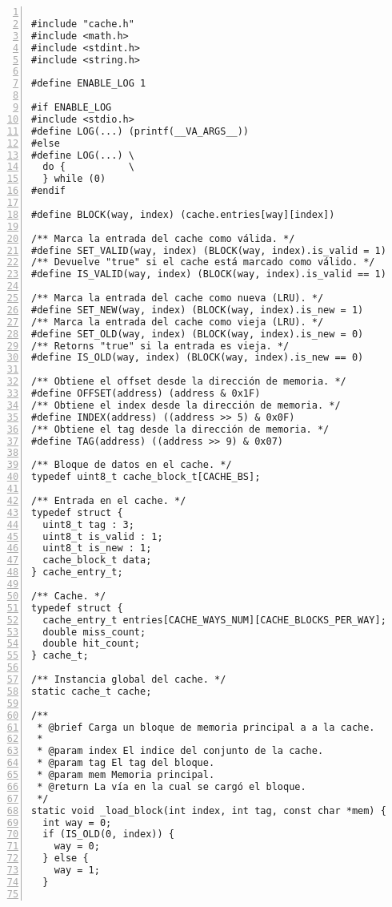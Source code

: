 \documentclass[11pt,a4paper]{article}
\begin{document}
\begin{lstlisting}[numbers=left, tabsize=2, basicstyle=\fontsize{11}{13}\ttfamily, frame=single, caption={makefile}]

#include "cache.h"
#include <math.h>
#include <stdint.h>
#include <string.h>

#define ENABLE_LOG 1

#if ENABLE_LOG
#include <stdio.h>
#define LOG(...) (printf(__VA_ARGS__))
#else
#define LOG(...) \
  do {           \
  } while (0)
#endif

#define BLOCK(way, index) (cache.entries[way][index])

/** Marca la entrada del cache como válida. */
#define SET_VALID(way, index) (BLOCK(way, index).is_valid = 1)
/** Devuelve "true" si el cache está marcado como válido. */
#define IS_VALID(way, index) (BLOCK(way, index).is_valid == 1)

/** Marca la entrada del cache como nueva (LRU). */
#define SET_NEW(way, index) (BLOCK(way, index).is_new = 1)
/** Marca la entrada del cache como vieja (LRU). */
#define SET_OLD(way, index) (BLOCK(way, index).is_new = 0)
/** Retorns "true" si la entrada es vieja. */
#define IS_OLD(way, index) (BLOCK(way, index).is_new == 0)

/** Obtiene el offset desde la dirección de memoria. */
#define OFFSET(address) (address & 0x1F)
/** Obtiene el index desde la dirección de memoria. */
#define INDEX(address) ((address >> 5) & 0x0F)
/** Obtiene el tag desde la dirección de memoria. */
#define TAG(address) ((address >> 9) & 0x07)

/** Bloque de datos en el cache. */
typedef uint8_t cache_block_t[CACHE_BS];

/** Entrada en el cache. */
typedef struct {
  uint8_t tag : 3;
  uint8_t is_valid : 1;
  uint8_t is_new : 1;
  cache_block_t data;
} cache_entry_t;

/** Cache. */
typedef struct {
  cache_entry_t entries[CACHE_WAYS_NUM][CACHE_BLOCKS_PER_WAY];
  double miss_count;
  double hit_count;
} cache_t;

/** Instancia global del cache. */
static cache_t cache;

/**
 * @brief Carga un bloque de memoria principal a a la cache.
 *
 * @param index El indice del conjunto de la cache.
 * @param tag El tag del bloque.
 * @param mem Memoria principal.
 * @return La vía en la cual se cargó el bloque.
 */
static void _load_block(int index, int tag, const char *mem) {
  int way = 0;
  if (IS_OLD(0, index)) {
    way = 0;
  } else {
    way = 1;
  }


\end{lstlisting}
\end{document}
